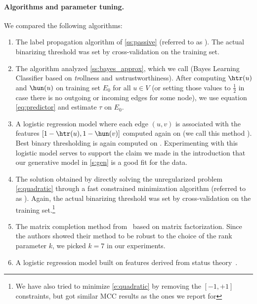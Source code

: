 \paragraph{Algorithms and parameter tuning.} 
We compared the following algorithms:

\begin{enumerate}[label=\textbf{\arabic*.}]
  \item The label propagation algorithm of \autoref{ss:passive} (referred to as \uslpropGsec{}).
    The actual binarizing threshold was set by cross-validation on the training set.

  \item The algorithm analyzed \autoref{ss:bayes_approx}, which we call \usrule{}
    (Bayes Learning Classifier based on \emph{tr}ollness and \emph{un}trustworthiness). After
    computing $\htr(u)$ and $\hun(u)$ on training set $E_0$ for all $u \in V$ (or setting those
    values to $\frac{1}{2}$ in case there is no outgoing or incoming edges for some node), we use
    equation \eqref{eq:predictor} and estimate $\tau$ on $E_0$.

  \item A logistic regression model where each edge $(u,v)$ is associated with the features
    $[1-\htr(u), 1-\hun(v)]$ computed again on \trainset{} (we call this method \uslogregp{}). Best
    binary thresholding is again computed on \trainset{}. Experimenting with this logistic model
    serves to support the claim we made in the introduction that our generative model in
    \autoref{s:gen} is a good fit for the data.

  \item  The solution obtained by directly solving the unregularized problem \eqref{e:quadratic}
    through a fast constrained minimization algorithm (referred to as \qoptim{}). Again, the actual
    binarizing threshold was set by cross-validation on the training set.\footnote{We have also
    tried to minimize \eqref{e:quadratic} by removing the $[-1,+1]$ constraints, but got similar MCC
    results as the ones we report for \qoptim{}}

  \item  The matrix completion method from~\autocite{LowRankCompletion14} based on \complowrank{}
    matrix factorization. Since the authors showed their method to be robust to the choice of the
    rank parameter $k$, we picked $k=7$ in our experiments.

  \item A logistic regression model built on \comptriads{} features derived from status
    theory~\autocite{Leskovec2010}.


\end{enumerate}
